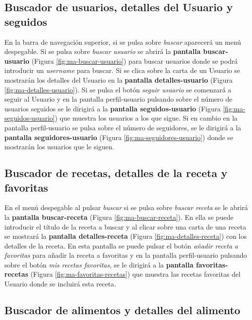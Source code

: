 \subsection{Buscador de usuarios, detalles del Usuario y seguidos}

En la barra de navegación superior, si se pulsa sobre \textit{buscar} aparecerá un menú despegable. Si se pulsa sobre \textit{buscar usuario} se abrirá la \textbf{pantalla buscar-usuario} (Figura \ref{fig:ma-buscar-usuario}) para buscar usuarios donde se podrá introducir un \textit{username} para buscar. Si se clica sobre la carta de un Usuario se mostrarán los detalles del Usuario en la \textbf{pantalla detalles-usuario} (Figura \ref{fig:ma-detalles-usuario}). Si se pulsa el botón \textit{seguir usuario} se comenzará a seguir al Usuario y en la pantalla perfil-usuario pulsando sobre el número de usuarios seguidos se le dirigirá a la \textbf{pantalla seguidos-usuario} (Figura \ref{fig:ma-seguidos-usuario}) que muestra los usuarios a los que sigue. Si en cambio en la pantalla perfil-usuario se pulsa sobre el número de seguidores, se le dirigirá a la \textbf{pantalla seguidores-usuario} (Figura \ref{fig:ma-seguidores-usuario}) donde se mostrarán los usuarios que le siguen.

\subsection{Buscador de recetas, detalles de la receta y favoritas}

En el menú despegable al pulsar \textit{buscar} si se pulsa sobre \textit{buscar receta} se le abrirá la \textbf{pantalla buscar-receta} (Figura \ref{fig:ma-buscar-receta}). En ella se puede introducir el título de la receta a buscar y al clicar sobre una carta de una receta se mostrará la \textbf{pantalla detalles-receta} (Figura \ref{fig:ma-detalles-receta}) con los detalles de la receta. En esta pantalla se puede pulsar el botón \textit{añadir receta a favoritas} para añadir la receta a favoritas y en la pantalla perfil-usuario pulsando sobre el botón \textit{mis recetas favoritas}, se le dirigirá a la \textbf{pantalla favoritas-recetas} (Figura \ref{fig:ma-favoritas-recetas}) que muestra las recetas favoritas del Usuario donde se incluirá esta receta. 

\subsection{Buscador de alimentos y detalles del alimento}

